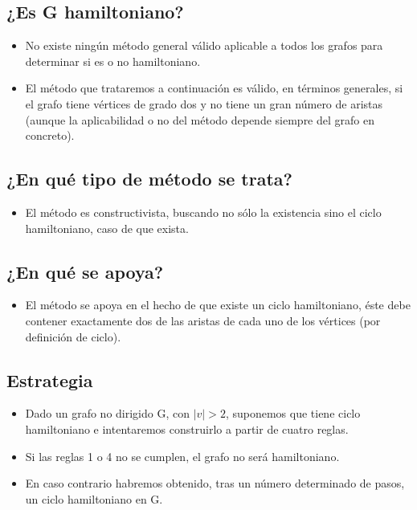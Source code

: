 \documentclass[journal]{IEEEtran}
\begin{document}
\subsection{¿Es G hamiltoniano?}
\begin{itemize}
	\item No existe ningún método general v{\'a}lido aplicable a todos los grafos para determinar si es o no hamiltoniano.
	\item	El m{\'e}todo que trataremos a continuaci{\'o}n es válido, en t{\'e}rminos generales, si el grafo tiene v{\'e}rtices de grado dos y no tiene un gran n{\'u}mero de aristas (aunque la aplicabilidad o no del m{\'e}todo depende siempre del grafo en concreto).
\end{itemize}

\subsection{¿En qué tipo de m{\'e}todo se trata?}
\begin{itemize}
	\item El m{\'e}todo es constructivista, buscando no s{\'o}lo la existencia sino el ciclo hamiltoniano, caso de que exista.
\end{itemize}

\subsection{¿En qu{\'e} se apoya?}
\begin{itemize}
	\item El m{\'e}todo se apoya en el hecho de que existe un ciclo hamiltoniano, éste debe contener exactamente dos de las aristas de cada uno de los v{\'e}rtices (por definición de ciclo).
\end{itemize}

\subsection{Estrategia}
\begin{itemize}
	\item	Dado un grafo no dirigido G, con $|v|>2$, suponemos que tiene ciclo hamiltoniano e intentaremos construirlo a partir de cuatro reglas.
	\item	Si las reglas 1 o 4 no se cumplen, el grafo no ser{\'a} hamiltoniano.
	\item En caso contrario habremos obtenido, tras un n{\'u}mero determinado de pasos, un ciclo hamiltoniano en G.
\end{itemize}
\end{document}
